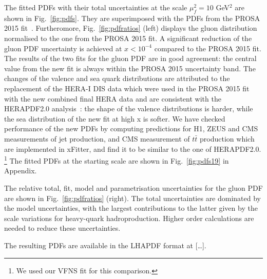 \documentclass[12pt]{article}
\begin{document}
The fitted PDFs with their total uncertainties at the scale $\mu^2_f=10$ GeV$^2$ are shown in Fig.~\ref{fig:pdfs}. They are superimposed with the PDFs from the PROSA 2015 fit~\cite{Zenaiev:2015rfa}. Furtheromore, Fig.~\ref{fig:pdfratios} (left) displays the gluon distribution normalised to the one from the PROSA 2015 fit. 
A significant reduction of the gluon PDF uncertainty is achieved at $x < 10^{-4}$ compared to the PROSA 2015 fit. 
The results of the two fits for the gluon PDF are in good agreement: the central value from the new fit is always within the PROSA 2015 uncertainty band. 
The changes of the valence and sea quark distributions are attributed to the replacement of the HERA-I DIS data which were used in the PROSA 2015 fit with the new combined final HERA data and are consistent with the HERAPDF2.0 analysis~\cite{Abramowicz:2015mha}: the shape of the valence distributions is harder, while the sea distribution of the new fit at high x is softer. 
We have checked performance of the new PDFs by computing predictions for H1, ZEUS and CMS measurements of jet production, and CMS measurement of $t\bar{t}$ production which are implemented in xFitter, and find it to be similar to the one of HERAPDF2.0.%
\footnote{We used our VFNS fit for this comparison.}
The fitted PDFs at the starting scale are shown in Fig.~\ref{fig:pdfs19} in Appendix.

The relative total, fit, model and parametrisation uncertainties for the gluon PDF are shown in Fig.~\ref{fig:pdfratios} (right). The total uncertainties are dominated by the model uncertainties, with the largest contributions to the latter given by the scale variations for heavy-quark hadroproduction. Higher order calculations are needed to reduce these uncertainties.

The resulting PDFs are available in the LHAPDF format at [\dots].
\end{document}
